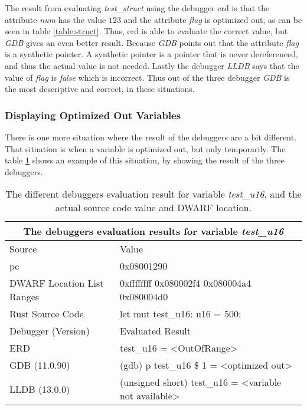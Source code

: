 The result from evaluating \emph{test\_struct} using the debugger \gls{erd} is that the attribute \emph{num} has the value $123$ and the attribute \emph{flag} is optimized out, as can be seen in table \ref{table:struct}.
Thus, \gls{erd} is able to evaluate the correct value, but \emph{GDB} gives an even better result.
Because \emph{GDB} points out that the attribute \emph{flag} is a synthetic pointer.
A synthetic pointer is a pointer that is never dereferenced, and thus the actual value is not needed. 
Lastly the debugger \emph{LLDB} says that the value of \emph{flag} is \emph{false} which is incorrect.
Thus out of the three debugger \emph{GDB} is the most descriptive and correct, in these situations.



\subsubsection{Displaying Optimized Out Variables}
There is one more situation where the result of the debuggers are a bit different.
That situation is when a variable is optimized out, but only temporarily.
The table \ref{table:u16} shows an example of this situation, by showing the result of the three debuggers.


\begin{table}[h]
	\centering
	\small
	\begin{tabular}{ |p{2cm}|p{8cm}|  }
		\hline
		\multicolumn{2}{|c|}{\textbf{The debuggers evaluation results for variable \emph{test\_u16}}} \\ 
		\hline
		\hline
		Source & Value \\
		\hline
		\acrfull{pc} & 0x08001290 \\

		DWARF Location List Ranges & 0xffffffff 	0x080002f4\newline
    					     0x080004a4 	0x080004d0\\

		Rust Source Code & let mut test\_u16: u16 = 500; \\
		\hline
		\hline
		Debugger (Version) & Evaluated Result \\
		\hline
		ERD & test\_u16 = \textless OutOfRange\textgreater \\

		GDB (11.0.90)  & (gdb) p test\_u16\newline
		\$ 1 = \textless optimized out\textgreater \\

		LLDB (13.0.0) & (unsigned short) test\_u16 = \textless variable not available\textgreater \\
		\hline
	\end{tabular}
	\caption{The different debuggers evaluation result for variable \emph{test\_u16}, and the actual source code value and DWARF location.}
	\label{table:u16}
\end{table}


